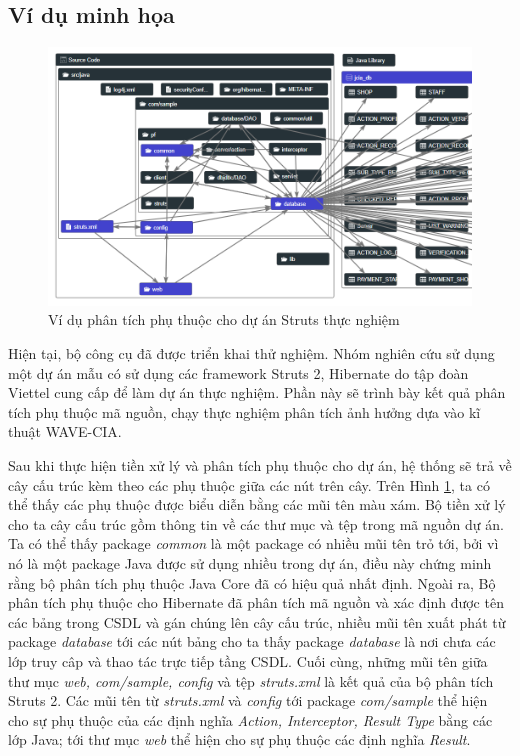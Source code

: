 \documentclass[12pt]{report}
\begin{document}
\subsection{Ví dụ minh họa}
\begin{figure}[h]
	\centering
	\includegraphics[width=0.8\linewidth]{images/sample-vitm}
	\caption{Ví dụ phân tích phụ thuộc cho dự án Struts thực nghiệm}
	\label{fig:sample-vitm}
\end{figure}

Hiện tại, bộ công cụ đã được triển khai thử nghiệm. Nhóm nghiên cứu sử dụng một dự án mẫu có sử dụng các framework Struts 2, Hibernate do tập đoàn Viettel cung cấp để làm dự án thực nghiệm. Phần này sẽ trình bày kết quả phân tích phụ thuộc mã nguồn, chạy thực nghiệm phân tích ảnh hưởng dựa vào kĩ thuật WAVE-CIA.

Sau khi thực hiện tiền xử lý và phân tích phụ thuộc cho dự án, hệ thống sẽ trả về cây cấu trúc kèm theo các phụ thuộc giữa các nút trên cây. Trên Hình \ref{fig:sample-vitm}, ta có thể thấy các phụ thuộc được biểu diễn bằng các mũi tên màu xám. Bộ tiền xử lý cho ta cây cấu trúc gồm thông tin về các thư mục và tệp trong mã nguồn dự án. Ta có thể thấy package \textit{common} là một package có nhiều mũi tên trỏ tới, bởi vì nó là một package Java được sử dụng nhiều trong dự án, điều này chứng minh rằng bộ phân tích phụ thuộc Java Core đã có hiệu quả nhất định. Ngoài ra, Bộ phân tích phụ thuộc cho Hibernate đã phân tích mã nguồn và xác định được tên các bảng trong CSDL và gán chúng lên cây cấu trúc, nhiều mũi tên xuất phát từ package \textit{database} tới các nút bảng cho ta thấy package \textit{database} là nơi chưa các lớp truy câp và thao tác trực tiếp tầng CSDL. Cuối cùng, những mũi tên giữa thư mục \textit{web, com/sample, config} và tệp \textit{struts.xml} là kết quả của bộ phân tích Struts 2. Các mũi tên từ \textit{struts.xml} và \textit{config} tới package \textit{com/sample} thể hiện cho sự phụ thuộc của các định nghĩa \textit{Action, Interceptor, Result Type} bằng các lớp Java; tới thư mục \textit{web} thể hiện cho sự phụ thuộc các định nghĩa \textit{Result}.
\end{document}
